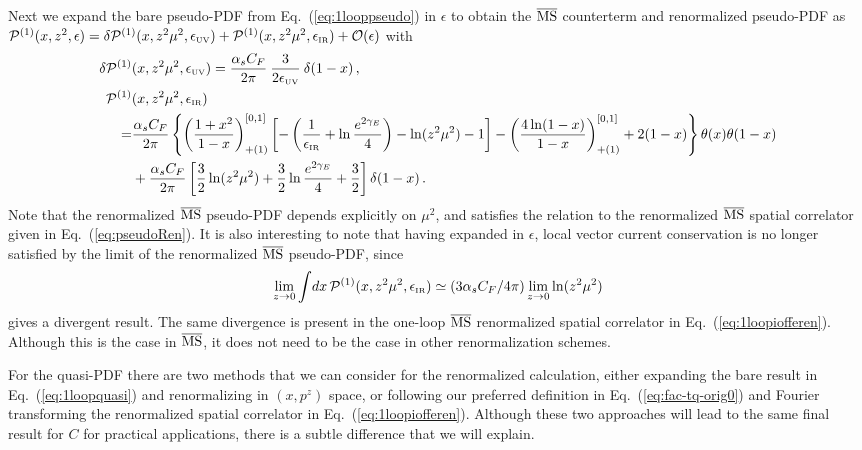 \documentclass[prd,aps,twocolumn,preprintnumbers,showpacs,nofootinbib,superscriptaddress,notitlepage]{revtex4-1}
\newcommand{\nn}{\nonumber}
\newcommand{\spcorr}{spatial correlator\xspace}
\DeclareRobustCommand{\eq}[1]{Eq.~(\ref{eq:#1})}
\begin{document}
\begin{widetext}
Next we expand the bare pseudo-PDF from Eq.~(\ref{eq:1looppseudo}) in $\epsilon$ to obtain the $\overline{\rm MS}$ counterterm and renormalized pseudo-PDF as ${\cal P}^{(1)} (x,z^2,\epsilon)= \delta {\cal P}^{(1)} (x,z^2\mu^2,\epsilon_{\mbox{\tiny UV}})+{\cal P}^{(1)} (x,z^2\mu^2,\epsilon_{\mbox{\tiny IR}})+{\cal O}(\epsilon)$ with
\begin{align}\label{eq:1looppseudopdfb}
\delta {\cal P}^{(1)} &(x,z^2\mu^2,\epsilon_{\mbox{\tiny UV}})
	= {\alpha_sC_F\over 2\pi}\:
    {3\over 2\epsilon_{\mbox{\tiny UV}}} \: \delta(1-x)
  \,, \nn\\
{\cal P}^{(1)} &(x,z^2\mu^2,\epsilon_{\mbox{\tiny IR}})
\nn\\
	=&{\alpha_sC_F\over 2\pi}\left\{\left({1+x^2\over 1-x}\right)^{[0,1]}_{+(1)}\left[- \left({1\over \epsilon_{\mbox{\tiny IR}}}+\ln{e^{2\gamma_E}\over 4}\right)-\ln(z^2 \mu^2)-1\right] - \left(4\ln(1-x)\over 1-x\right)^{[0,1]}_{+(1)}  +2(1-x)\right\}\theta(x)\theta(1-x)\nonumber\\
	&  +{\alpha_sC_F\over 2\pi}\left[{3\over2}\ln(z^2\mu^2) + {3\over2}\ln{e^{2\gamma_E}\over 4}+{3\over2}\right]\delta(1-x)
 \,.
\end{align}
Note that the renormalized $\overline{\rm MS}$ pseudo-PDF depends explicitly on $\mu^2$, and satisfies the relation to the renormalized $\overline{\rm MS}$ \spcorr given in Eq.~(\ref{eq:pseudoRen}).
It is also interesting to note that having expanded in $\epsilon$, local vector current conservation is no longer satisfied by the limit of the renormalized $\overline{\rm MS}$ pseudo-PDF, since
\begin{align} \label{eq:Ppdfconsrv}
\lim_{z\to 0} \int\! dx \, {\cal P}^{(1)} (x,z^2\mu^2,\epsilon_{\mbox{\tiny IR}}) \simeq (3\alpha_s C_F/4\pi) \lim_{z\to 0} \ln(z^2\mu^2)
\end{align}
gives a divergent result. The same divergence is present in the one-loop $\overline{\rm MS}$ renormalized \spcorr in \eq{1loopiofferen}.  Although this is the case in $\overline{\rm MS}$, it does not need to be the case in other renormalization schemes.

For the quasi-PDF there are two methods that we can consider for the renormalized calculation, either expanding the bare result in \eq{1loopquasi} and renormalizing in $(x,p^z)$ space, or following our preferred definition in \eq{fac-tq-orig0} and Fourier transforming the renormalized \spcorr in \eq{1loopiofferen}.  Although these two approaches will lead to the same final result for $C$ for practical applications, there is a subtle difference that we will explain.


\end{widetext}
\end{document}
